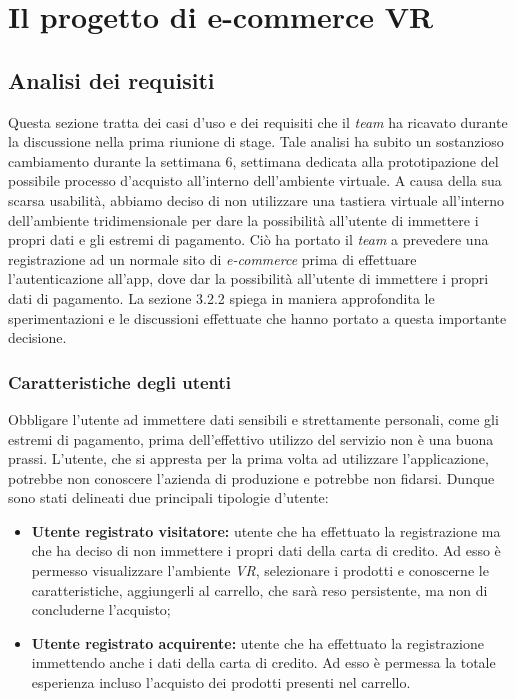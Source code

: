 \newpage

\chapter{Il progetto di e-commerce VR}
\label{cap:ilprogettoe-commercevr}

\section{Analisi dei requisiti}

Questa sezione tratta dei casi d'uso e dei requisiti che il \textit{team} ha ricavato durante la discussione nella prima riunione di stage. Tale analisi ha subito un sostanzioso cambiamento durante la settimana 6, settimana dedicata alla prototipazione del possibile processo d'acquisto all'interno dell'ambiente virtuale. A causa della sua scarsa usabilità, abbiamo deciso di non utilizzare una tastiera virtuale all'interno dell'ambiente tridimensionale per dare la possibilità all'utente di immettere i propri dati e gli estremi di pagamento. Ciò ha portato il \textit{team} a prevedere una registrazione ad un normale sito di \textit{e-commerce} prima di effettuare l'autenticazione all'app, dove dar la possibilità all'utente di immettere i propri dati di pagamento. La sezione 3.2.2 spiega in maniera approfondita le sperimentazioni e le discussioni effettuate che hanno portato a questa importante decisione. 


\subsection{Caratteristiche degli utenti}

Obbligare l'utente ad immettere dati sensibili e strettamente personali, come gli estremi di pagamento, prima dell'effettivo utilizzo del servizio non è una buona prassi. L'utente, che si appresta per la prima volta ad utilizzare l'applicazione, potrebbe non conoscere l'azienda di produzione e potrebbe non fidarsi. Dunque sono stati delineati due principali tipologie d'utente:

\begin{itemize}
	\item \textbf{Utente registrato visitatore:} utente che ha effettuato la registrazione ma che ha deciso di non immettere i propri dati della carta di credito. Ad esso è permesso visualizzare l'ambiente \textit{VR}, selezionare i prodotti e conoscerne le caratteristiche, aggiungerli al carrello, che sarà reso persistente, ma non di concluderne l'acquisto;
	\item \textbf{Utente registrato acquirente:} utente che ha effettuato la registrazione immettendo anche i dati della carta di credito. Ad esso è permessa la totale esperienza incluso l'acquisto dei prodotti presenti nel carrello.
\end{itemize}

